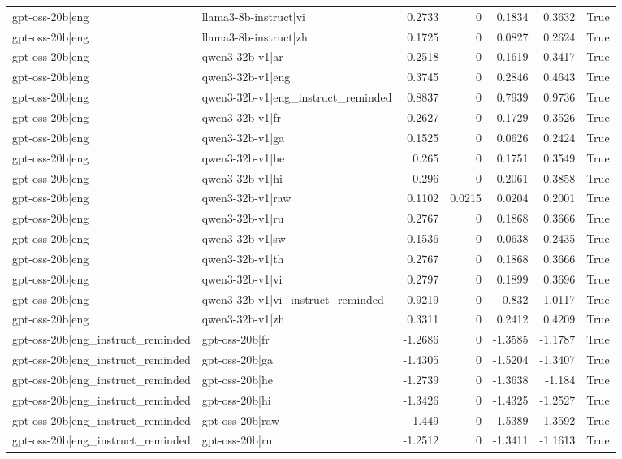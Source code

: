 \begin{table}
\begin{tabular}{l l r r r r l}
gpt-oss-20b|eng & llama3-8b-instruct|vi & 0.2733 & 0 & 0.1834 & 0.3632 & True \\
gpt-oss-20b|eng & llama3-8b-instruct|zh & 0.1725 & 0 & 0.0827 & 0.2624 & True \\
gpt-oss-20b|eng & qwen3-32b-v1|ar & 0.2518 & 0 & 0.1619 & 0.3417 & True \\
gpt-oss-20b|eng & qwen3-32b-v1|eng & 0.3745 & 0 & 0.2846 & 0.4643 & True \\
gpt-oss-20b|eng & qwen3-32b-v1|eng_instruct_reminded & 0.8837 & 0 & 0.7939 & 0.9736 & True \\
gpt-oss-20b|eng & qwen3-32b-v1|fr & 0.2627 & 0 & 0.1729 & 0.3526 & True \\
gpt-oss-20b|eng & qwen3-32b-v1|ga & 0.1525 & 0 & 0.0626 & 0.2424 & True \\
gpt-oss-20b|eng & qwen3-32b-v1|he & 0.265 & 0 & 0.1751 & 0.3549 & True \\
gpt-oss-20b|eng & qwen3-32b-v1|hi & 0.296 & 0 & 0.2061 & 0.3858 & True \\
gpt-oss-20b|eng & qwen3-32b-v1|raw & 0.1102 & 0.0215 & 0.0204 & 0.2001 & True \\
gpt-oss-20b|eng & qwen3-32b-v1|ru & 0.2767 & 0 & 0.1868 & 0.3666 & True \\
gpt-oss-20b|eng & qwen3-32b-v1|sw & 0.1536 & 0 & 0.0638 & 0.2435 & True \\
gpt-oss-20b|eng & qwen3-32b-v1|th & 0.2767 & 0 & 0.1868 & 0.3666 & True \\
gpt-oss-20b|eng & qwen3-32b-v1|vi & 0.2797 & 0 & 0.1899 & 0.3696 & True \\
gpt-oss-20b|eng & qwen3-32b-v1|vi_instruct_reminded & 0.9219 & 0 & 0.832 & 1.0117 & True \\
gpt-oss-20b|eng & qwen3-32b-v1|zh & 0.3311 & 0 & 0.2412 & 0.4209 & True \\
gpt-oss-20b|eng_instruct_reminded & gpt-oss-20b|fr & -1.2686 & 0 & -1.3585 & -1.1787 & True \\
gpt-oss-20b|eng_instruct_reminded & gpt-oss-20b|ga & -1.4305 & 0 & -1.5204 & -1.3407 & True \\
gpt-oss-20b|eng_instruct_reminded & gpt-oss-20b|he & -1.2739 & 0 & -1.3638 & -1.184 & True \\
gpt-oss-20b|eng_instruct_reminded & gpt-oss-20b|hi & -1.3426 & 0 & -1.4325 & -1.2527 & True \\
gpt-oss-20b|eng_instruct_reminded & gpt-oss-20b|raw & -1.449 & 0 & -1.5389 & -1.3592 & True \\
gpt-oss-20b|eng_instruct_reminded & gpt-oss-20b|ru & -1.2512 & 0 & -1.3411 & -1.1613 & True \\

\end{tabular}
\end{table}

